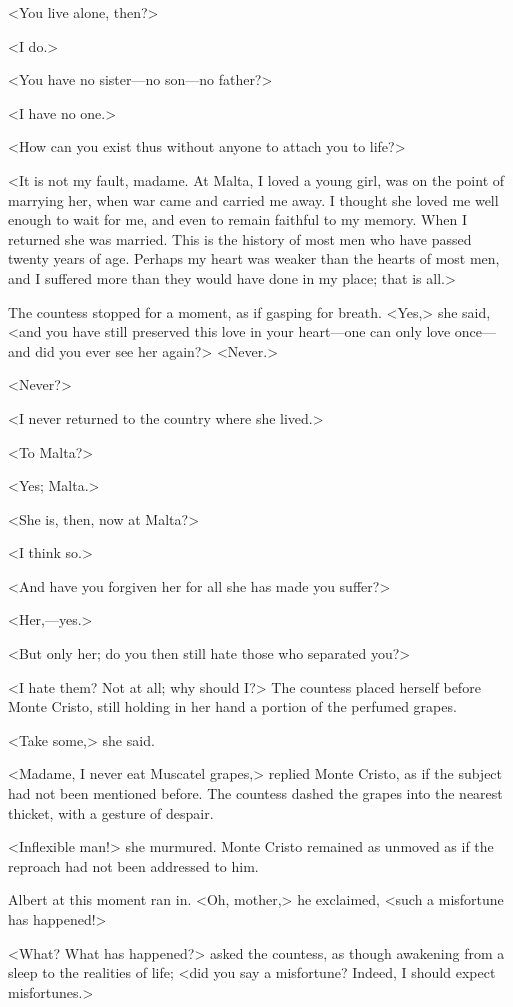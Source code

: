  <You live alone, then?> 

 <I do.> 

 <You have no sister—no son—no father?> 

 <I have no one.> 

 <How can you exist thus without anyone to attach you to life?> 

 <It is not my fault, madame. At Malta, I loved a young girl, was on the point of marrying her, when war came and carried me away. I thought she loved me well enough to wait for me, and even to remain faithful to my memory. When I returned she was married. This is the history of most men who have passed twenty years of age. Perhaps my heart was weaker than the hearts of most men, and I suffered more than they would have done in my place; that is all.> 

 The countess stopped for a moment, as if gasping for breath. <Yes,> she said, <and you have still preserved this love in your heart—one can only love once—and did you ever see her again?>  <Never.> 

 <Never?> 

 <I never returned to the country where she lived.> 

 <To Malta?> 

 <Yes; Malta.> 

 <She is, then, now at Malta?> 

 <I think so.> 

 <And have you forgiven her for all she has made you suffer?> 

 <Her,—yes.> 

 <But only her; do you then still hate those who separated you?> 

 <I hate them? Not at all; why should I?> The countess placed herself before Monte Cristo, still holding in her hand a portion of the perfumed grapes. 

 <Take some,> she said. 

 <Madame, I never eat Muscatel grapes,> replied Monte Cristo, as if the subject had not been mentioned before. The countess dashed the grapes into the nearest thicket, with a gesture of despair. 

 <Inflexible man!> she murmured. Monte Cristo remained as unmoved as if the reproach had not been addressed to him. 

 Albert at this moment ran in. <Oh, mother,> he exclaimed, <such a misfortune has happened!> 

 <What? What has happened?> asked the countess, as though awakening from a sleep to the realities of life; <did you say a misfortune? Indeed, I should expect misfortunes.> 

